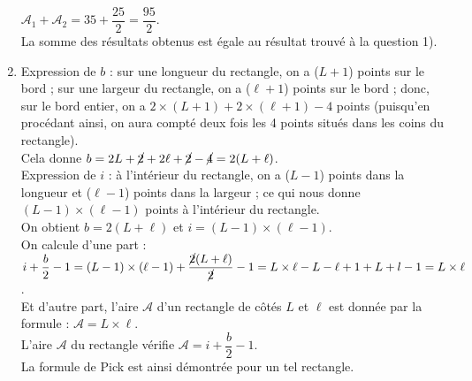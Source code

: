 \begin{enumerate}
      $\mathcal{A}_1+\mathcal{A}_2 =35+\dfrac{25}{2} =\dfrac{95}{2}.$ \\ [1mm]
      {\blue La somme des résultats obtenus est égale au résultat trouvé à la question 1).}
   \item Expression de $b$ : sur une longueur du rectangle, on a ($L+1$) points sur le bord ; sur une largeur du rectangle, on a ($\ell+1$) points sur le bord ; donc, sur le bord entier, on a $2\times(L+1)+2\times(\ell+1)-4$ points (puisqu'en procédant ainsi, on aura compté deux fois les 4 points situés dans les coins du rectangle). \\
      Cela donne $b =2L+\cancel{2}+2\ell+\cancel{2}-\cancel{4}=2(L+\ell)$. \\
      Expression de $i$ : à l'intérieur du rectangle, on a ($L-1$) points dans la longueur et ($\ell-1$) points dans la largeur ; ce qui nous donne $(L-1)\times(\ell-1)$ points à l'intérieur du rectangle. \\
      {\blue On obtient $b =2(L+\ell)$ et $i =(L-1)\times(\ell-1)$.} \\
      On calcule d'une part : $i+\dfrac{b}{2}-1 =(L-1)\times(\ell-1)+\dfrac{\cancel{2}(L+\ell)}{\cancel{2}}-1 =L\times\ell-L-\ell+1+L+l-1 =L\times\ell$. \\ [1mm]
      Et d'autre part, l'aire $\mathcal{A}$ d'un rectangle de côtés $L$ et $\ell$ est donnée par la formule : $\mathcal{A} =L\times\ell$. \\
      {\blue L'aire $\mathcal{A}$ du rectangle vérifie $\mathcal{A} =i+\dfrac{b}{2}-1$.} \\
      La formule de Pick est ainsi démontrée pour un tel rectangle.
   \end{enumerate}
